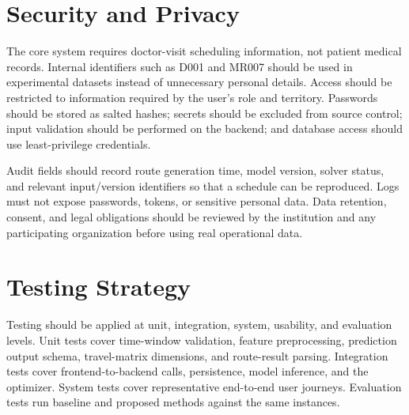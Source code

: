 \documentclass[12pt,a4paper,oneside]{report}
\begin{document}
\section{Security and Privacy}
The core system requires doctor-visit scheduling information, not patient medical records. Internal identifiers such as D001 and MR007 should be used in experimental datasets instead of unnecessary personal details. Access should be restricted to information required by the user's role and territory. Passwords should be stored as salted hashes; secrets should be excluded from source control; input validation should be performed on the backend; and database access should use least-privilege credentials.

Audit fields should record route generation time, model version, solver status, and relevant input/version identifiers so that a schedule can be reproduced. Logs must not expose passwords, tokens, or sensitive personal data. Data retention, consent, and legal obligations should be reviewed by the institution and any participating organization before using real operational data.

\section{Testing Strategy}
Testing should be applied at unit, integration, system, usability, and evaluation levels. Unit tests cover time-window validation, feature preprocessing, prediction output schema, travel-matrix dimensions, and route-result parsing. Integration tests cover frontend-to-backend calls, persistence, model inference, and the optimizer. System tests cover representative end-to-end user journeys. Evaluation tests run baseline and proposed methods against the same instances.
\end{document}
